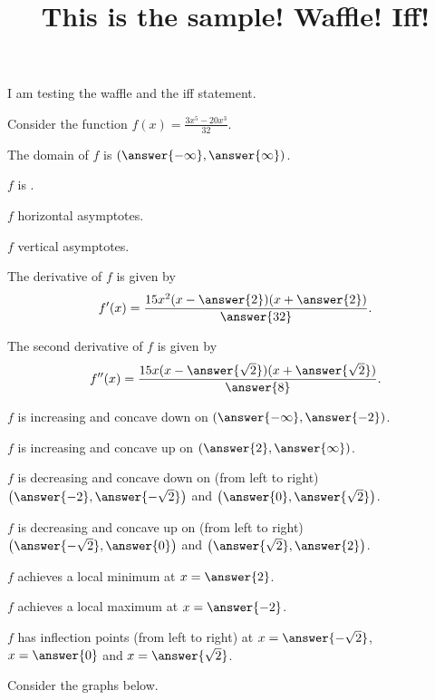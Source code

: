\documentclass{ximera}
\title[Breal-grond]{This is the sample! Waffle!  Iff!}
\begin{document}

I am testing the waffle and the iff statement.




\begin{exercise}

Consider the function $f(x) = \frac{3x^5-20x^3}{32}$.

The domain of $f$ is $\left(\answer{-\infty},\answer{\infty}\right)$.

$f$ is .

$f$  horizontal asymptotes.

$f$  vertical asymptotes.

The derivative of $f$ is given by
\[
f'(x) =\frac{15x^2(x- \answer{2})(x+ \answer{2})}{\answer{32}}.
\]

The second derivative of $f$ is given by 
\[
f''(x) =\frac{15x(x- \answer{\sqrt{2}})(x+ \answer{\sqrt{2}})}{ \answer{8}}.
\]

$f$ is increasing and concave down on $\left(\answer{-\infty},\answer{-2}\right)$.

$f$ is increasing and concave up on $\left(\answer{2},\answer{\infty}\right)$.

$f$ is decreasing and concave down on (from left to right) $\left(\answer{-2},\answer{-\sqrt{2}}\right)$ and $\left(\answer{0},\answer{\sqrt{2}}\right)$.

$f$ is decreasing and concave up on (from left to right) $\left(\answer{-\sqrt{2}},\answer{0}\right)$ and $\left(\answer{\sqrt{2}},\answer{2}\right)$.

$f$ achieves a local minimum at $x=\answer{2}$.

$f$ achieves a local maximum at $x=\answer{-2}$.

$f$ has inflection points (from left to right) at $x=\answer{-\sqrt{2}}$, $x=\answer{0}$ and $x=\answer{\sqrt{2}}$.

Consider the graphs below.

\end{exercise}
\end{document}
